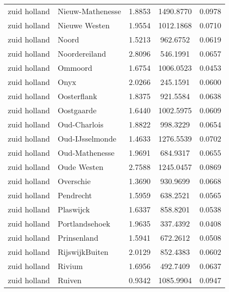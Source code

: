 \begin{longtable}{llccc}
	zuid holland  & Nieuw-Mathenesse                 & 1.8853  & 1490.8770 & 0.0978          \\
	zuid holland  & Nieuwe Westen                    & 1.9554  & 1012.1868 & 0.0710          \\
	zuid holland  & Noord                            & 1.5213  & 962.6752  & 0.0619          \\
	zuid holland  & Noordereiland                    & 2.8096  & 546.1991  & 0.0657          \\
	zuid holland  & Ommoord                          & 1.6754  & 1006.0523 & 0.0453          \\
	zuid holland  & Onyx                             & 2.0266  & 245.1591  & 0.0600          \\
	zuid holland  & Oosterflank                      & 1.8375  & 921.5584  & 0.0638          \\
	zuid holland  & Oostgaarde                       & 1.6440  & 1002.5975 & 0.0609          \\
	zuid holland  & Oud-Charlois                     & 1.8822  & 998.3229  & 0.0654          \\
	zuid holland  & Oud-IJsselmonde                  & 1.4633  & 1276.5539 & 0.0702          \\
	zuid holland  & Oud-Mathenesse                   & 1.9691  & 684.9317  & 0.0655          \\
	zuid holland  & Oude Westen                      & 2.7588  & 1245.0457 & 0.0869          \\
	zuid holland  & Overschie                        & 1.3690  & 930.9699  & 0.0668          \\
	zuid holland  & Pendrecht                        & 1.5959  & 638.2521  & 0.0565          \\
	zuid holland  & Plaswijck                        & 1.6337  & 858.8201  & 0.0538          \\
	zuid holland  & Portlandsehoek                   & 1.9635  & 337.4392  & 0.0408          \\
	zuid holland  & Prinsenland                      & 1.5941  & 672.2612  & 0.0508          \\
	zuid holland  & RijswijkBuiten                   & 2.0129  & 852.4383  & 0.0602          \\
	zuid holland  & Rivium                           & 1.6956  & 492.7409  & 0.0637          \\
	zuid holland  & Ruiven                           & 0.9342  & 1085.9904 & 0.0947          \\

\end{longtable}
